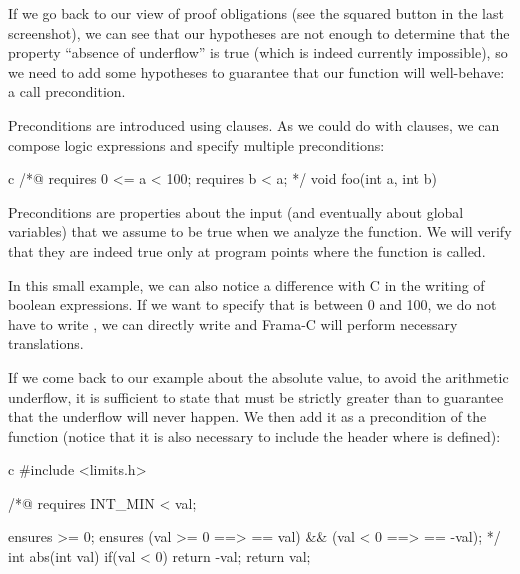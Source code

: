 \documentclass[middle]{zmdocument}
\begin{document}
If we go back to our view of proof obligations (see the squared button
in the last screenshot), we can see that our hypotheses are not enough
to determine that the property ``absence of underflow'' is true (which
is indeed currently impossible), so we need to add some hypotheses to
guarantee that our function will well-behave: a call precondition.






Preconditions are introduced using  clauses. As we
could do with  clauses, we can compose logic expressions
and specify multiple preconditions:



\begin{CodeBlock}{c}
/*@
  requires 0 <= a < 100;
  requires b < a;
*/
void foo(int a, int b){
  
}
\end{CodeBlock}



Preconditions are properties about the input (and eventually about
global variables) that we assume to be true when we analyze the
function. We will verify that they are indeed true only at program
points where the function is called.



In this small example, we can also notice a difference with C in the
writing of boolean expressions. If we want to specify that  is
between 0 and 100, we do not have to write ,
we can directly write  and Frama-C will
perform necessary translations.



If we come back to our example about the absolute value, to avoid the
arithmetic underflow, it is sufficient to state that  must
be strictly greater than  to guarantee that the
underflow will never happen. We then add it as a precondition of the
function (notice that it is also necessary to include the header where
 is defined):



\begin{CodeBlock}{c}
#include <limits.h>

/*@
  requires INT_MIN < val;

  ensures \result >= 0;
  ensures (val >= 0 ==> \result == val) && 
          (val < 0 ==> \result == -val);
*/
int abs(int val){
  if(val < 0) return -val;
  return val;
}
\end{CodeBlock}
\end{document}

